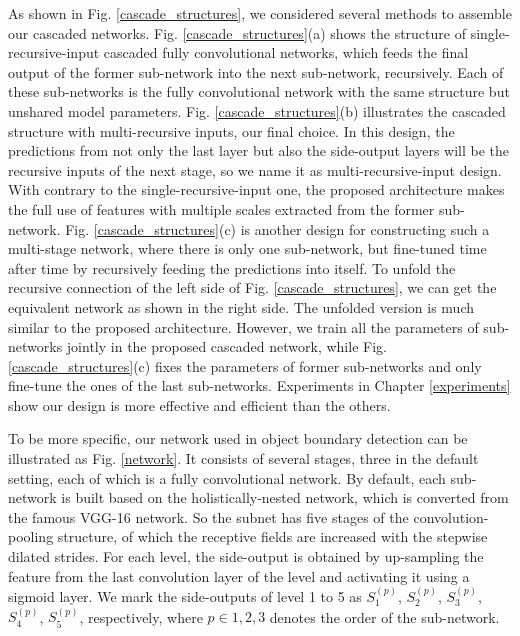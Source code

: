 \documentclass[senior]{IPSstyle}
\begin{document}
As shown in Fig. \ref{cascade_structures}, we considered several methods to assemble our cascaded networks. Fig. \ref{cascade_structures}(a) shows the structure of single-recursive-input cascaded fully convolutional networks, which feeds the final output of the former sub-network into the next sub-network, recursively. Each of these sub-networks is the fully convolutional network with the same structure but unshared model parameters. Fig. \ref{cascade_structures}(b) illustrates the cascaded structure with multi-recursive inputs, our final choice. In this design, the predictions from not only the last layer but also the side-output layers\cite{Xie2015} will be the recursive inputs of the next stage, so we name it as multi-recursive-input design. With contrary to the single-recursive-input one, the proposed architecture makes the full use of features with multiple scales extracted from the former sub-network. Fig. \ref{cascade_structures}(c) is another design for constructing such a multi-stage network, where there is only one sub-network, but fine-tuned time after time by recursively feeding the  predictions into itself. To unfold the recursive connection of the left side of Fig. \ref{cascade_structures}, we can get the equivalent network as shown in the right side. The unfolded version is much similar to the proposed architecture. However, we train all the parameters of sub-networks jointly in the proposed cascaded network, while Fig. \ref{cascade_structures}(c) fixes the parameters of former sub-networks and only fine-tune the ones of the last sub-networks. Experiments in Chapter \ref{experiments} show our design is more effective and efficient than the others.

To be more specific, our network used in object boundary detection can be illustrated as Fig. \ref{network}. It consists of several stages, three in the default setting, each of which is a fully convolutional network. 
By default, each sub-network is built based on the holistically-nested network\cite{Xie2015}, which is converted from the famous VGG-16\cite{Simonyan2014} network. So the subnet has five stages of the convolution-pooling structure, of which the receptive fields are increased with the stepwise dilated strides. For each level, the side-output is obtained by up-sampling the feature from the last convolution layer of the level and activating it using a sigmoid layer. We mark the side-outputs of level 1 to 5 as \(S_{1}^{(p)}\), \(S_{2}^{(p)}\), \(S_{3}^{(p)}\), \(S_{4}^{(p)}\), \(S_{5}^{(p)}\), respectively, where \(p \in{1, 2, 3}\) denotes the order of the sub-network. 
\end{document}
